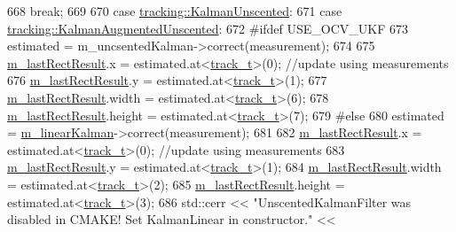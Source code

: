 \begin{DoxyCode}
668             \textcolor{keywordflow}{break};
669 
670         \textcolor{keywordflow}{case} \mbox{\hyperlink{namespacetracking_a83f2c4d58ea2737f7d6296dce3eb722aa39d914d61ae37e52ad325f55d199dabc}{tracking::KalmanUnscented}}:
671         \textcolor{keywordflow}{case} \mbox{\hyperlink{namespacetracking_a83f2c4d58ea2737f7d6296dce3eb722aa442bc8be9c68f72f1bc7952153cbf4c7}{tracking::KalmanAugmentedUnscented}}:
672 \textcolor{preprocessor}{#ifdef USE\_OCV\_UKF}
673             estimated = m\_uncsentedKalman->correct(measurement);
674 
675             \mbox{\hyperlink{class_t_kalman_filter_aed4818c7aac455928ef02dd03f8bfe56}{m\_lastRectResult}}.x = estimated.at<\mbox{\hyperlink{defines_8h_a7ce9c8817b42ab418e61756f579549ab}{track\_t}}>(0);   \textcolor{comment}{//update using
       measurements}
676             \mbox{\hyperlink{class_t_kalman_filter_aed4818c7aac455928ef02dd03f8bfe56}{m\_lastRectResult}}.y = estimated.at<\mbox{\hyperlink{defines_8h_a7ce9c8817b42ab418e61756f579549ab}{track\_t}}>(1);
677             \mbox{\hyperlink{class_t_kalman_filter_aed4818c7aac455928ef02dd03f8bfe56}{m\_lastRectResult}}.width = estimated.at<\mbox{\hyperlink{defines_8h_a7ce9c8817b42ab418e61756f579549ab}{track\_t}}>(6);
678             \mbox{\hyperlink{class_t_kalman_filter_aed4818c7aac455928ef02dd03f8bfe56}{m\_lastRectResult}}.height = estimated.at<\mbox{\hyperlink{defines_8h_a7ce9c8817b42ab418e61756f579549ab}{track\_t}}>(7);
679 \textcolor{preprocessor}{#else}
680             estimated = \mbox{\hyperlink{class_t_kalman_filter_aec607aacb57ef1f78e514c6b3ef18435}{m\_linearKalman}}->correct(measurement);
681 
682             \mbox{\hyperlink{class_t_kalman_filter_aed4818c7aac455928ef02dd03f8bfe56}{m\_lastRectResult}}.x = estimated.at<\mbox{\hyperlink{defines_8h_a7ce9c8817b42ab418e61756f579549ab}{track\_t}}>(0);   \textcolor{comment}{//update using
       measurements}
683             \mbox{\hyperlink{class_t_kalman_filter_aed4818c7aac455928ef02dd03f8bfe56}{m\_lastRectResult}}.y = estimated.at<\mbox{\hyperlink{defines_8h_a7ce9c8817b42ab418e61756f579549ab}{track\_t}}>(1);
684             \mbox{\hyperlink{class_t_kalman_filter_aed4818c7aac455928ef02dd03f8bfe56}{m\_lastRectResult}}.width = estimated.at<\mbox{\hyperlink{defines_8h_a7ce9c8817b42ab418e61756f579549ab}{track\_t}}>(2);
685             \mbox{\hyperlink{class_t_kalman_filter_aed4818c7aac455928ef02dd03f8bfe56}{m\_lastRectResult}}.height = estimated.at<\mbox{\hyperlink{defines_8h_a7ce9c8817b42ab418e61756f579549ab}{track\_t}}>(3);
686             std::cerr << \textcolor{stringliteral}{"UnscentedKalmanFilter was disabled in CMAKE! Set KalmanLinear in constructor."} <<

\end{DoxyCode}
